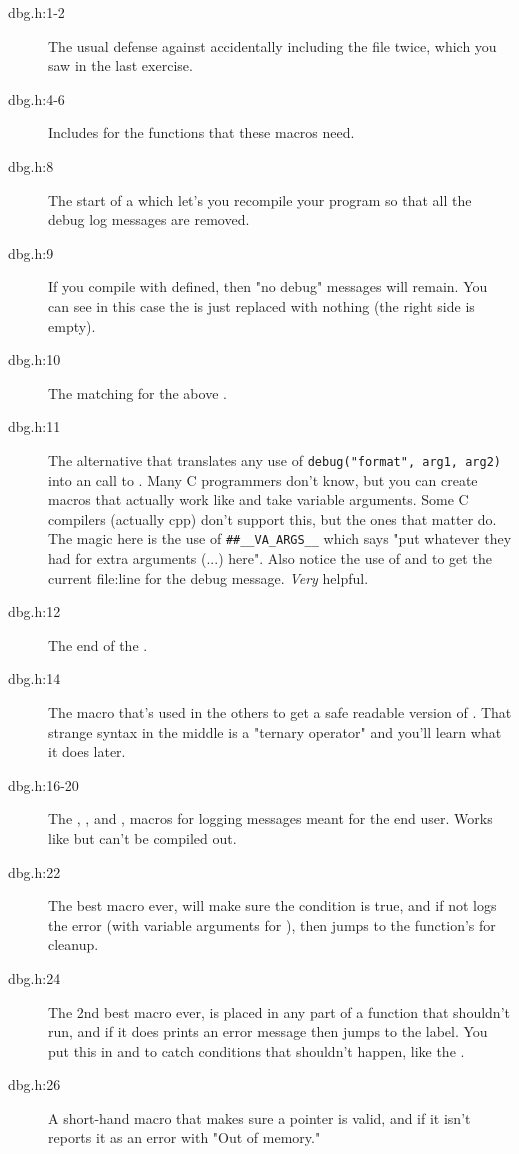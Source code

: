 \begin{description}
\item[dbg.h:1-2] The usual defense against accidentally including the file
    twice, which you saw in the last exercise.
\item[dbg.h:4-6] Includes for the functions that these macros need.
\item[dbg.h:8] The start of a  which let's you recompile your
    program so that all the debug log messages are removed.
\item[dbg.h:9] If you compile with  defined, then "no debug" messages
    will remain.  You can see in this case the  is just
    replaced with nothing (the right side is empty).
\item[dbg.h:10] The matching  for the above .
\item[dbg.h:11] The alternative  that translates any use
    of \verb|debug("format", arg1, arg2)| into an  call 
    to .  Many C programmers don't know, but you can create
    macros that actually work like  and take variable arguments.
    Some C compilers (actually cpp) don't support this, but the ones that matter do.
    The magic here is the use of \verb|##__VA_ARGS__| which says 
    "put whatever they had for extra arguments (...) here".  Also notice 
    the use of  and  to get the
    current file:line for the debug message.  \emph{Very} helpful.
\item[dbg.h:12] The end of the .
\item[dbg.h:14] The  macro that's used in the others to get a
    safe readable version of .  That strange syntax in the
    middle is a "ternary operator" and you'll learn what it does later.
\item[dbg.h:16-20] The , , and ,
    macros for logging messages meant for the end user.  Works
    like  but can't be compiled out.
\item[dbg.h:22] The best macro ever,  will make sure the condition
     is true, and if not logs the error  (with variable
    arguments for ), then jumps to the function's 
    for cleanup.
\item[dbg.h:24] The 2nd best macro ever,  is placed in any part of a
    function that shouldn't run, and if it does prints an error message then
    jumps to the  label.  You put this in 
    and  to catch conditions that shouldn't happen,
    like the .
\item[dbg.h:26] A short-hand macro  that makes sure a pointer is 
    valid, and if it isn't reports it as an error with "Out of memory."


\end{description}
